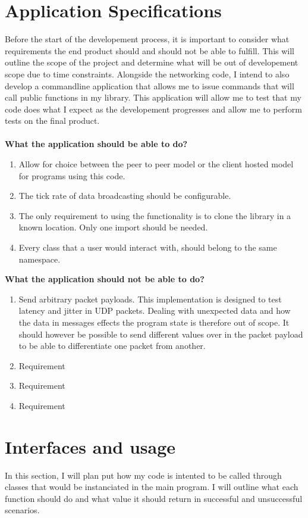 \section{Application Specifications}
Before the start of the developement process, it is important to consider what requirements the end product should and should not be able to fulfill. This will outline the scope of the project and determine what will be out of developement scope due to time constraints. Alongside the networking code, I intend to also develop a commandline application that allows me to issue commands that will call public functions in my library. This application will allow me to test that my code does what I expect as the developement progresses and allow me to perform tests on the final product.
\\
\\
\textbf{What the application should be able to do?}
\begin{enumerate}
\item Allow for choice between the peer to peer model or the client hosted model for programs using this code.
\item The tick rate of data broadcasting should be configurable.
\item The only requirement to using the functionality is to clone the library in a known location. Only one import should be needed.
\item Every class that a user would interact with, should belong to the same namespace.
\end{enumerate}
\textbf{What the application should not be able to do?}
\begin{enumerate}
\item Send arbitrary packet payloads. This implementation is designed to test latency and jitter in UDP packets. Dealing with unexpected data and how the data in messages effects the program state is therefore out of scope. It should however be possible to send different values over in the packet payload to be able to differentiate one packet from another.
\item Requirement
\item Requirement
\item Requirement
\end{enumerate}

\newpage
\section{Interfaces and usage}
In this section, I will plan put how my code is intented to be called through classes that would be instanciated in the main program. I will outline what each function should do and what value it should return in successful and unsuccessful scenarios.


